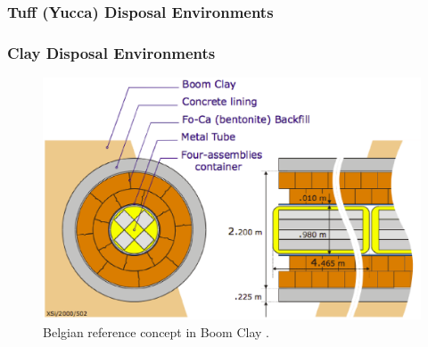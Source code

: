 
\begin{frame}[ctb!]
  \frametitle{Tuff (Yucca) Disposal Environments}
  \footnotesize{
  }
\end{frame}

\begin{frame}[ctb!]
  \frametitle{Clay Disposal Environments}
  \footnotesize{

  \begin{figure}[h!]
    \begin{center}
      \includegraphics[height=.7\textheight]{belgianClayRedImp.eps}
    \end{center}
    \caption{Belgian reference concept in Boom Clay 
    \cite{von_lensa_red-impact_2008}.}
    \label{fig:belgianClayRedImp}
  \end{figure}

}
\end{frame}

